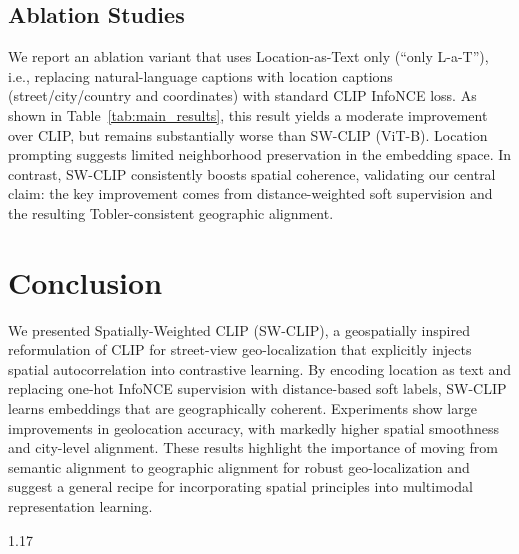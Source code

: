 \documentclass{isprs}
\begin{document}
\subsection{Ablation Studies}

We report an ablation variant that uses Location-as-Text only (“only L-a-T”), i.e., replacing natural-language captions with location captions (street/city/country and coordinates) with standard CLIP InfoNCE loss. As shown in Table~\ref{tab:main_results}, this result yields a moderate improvement over CLIP, but remains substantially worse than SW-CLIP (ViT-B). Location prompting suggests limited neighborhood preservation in the embedding space. In contrast, SW-CLIP consistently boosts spatial coherence, validating our central claim: the key improvement comes from distance-weighted soft supervision and the resulting Tobler-consistent geographic alignment.

\section{Conclusion}\label{sec:conclusion}

We presented Spatially-Weighted CLIP (SW-CLIP), a geospatially inspired reformulation of CLIP for street-view geo-localization that explicitly injects spatial autocorrelation into contrastive learning. By encoding location as text and replacing one-hot InfoNCE supervision with distance-based soft labels, SW-CLIP learns embeddings that are geographically coherent. Experiments show large improvements in geolocation accuracy, with markedly higher spatial smoothness and city-level alignment. These results highlight the importance of moving from semantic alignment to geographic alignment for robust geo-localization and suggest a general recipe for incorporating spatial principles into multimodal representation learning.


{
	\begin{spacing}{1.17}
		\normalsize
	\end{spacing}
}
\end{document}

